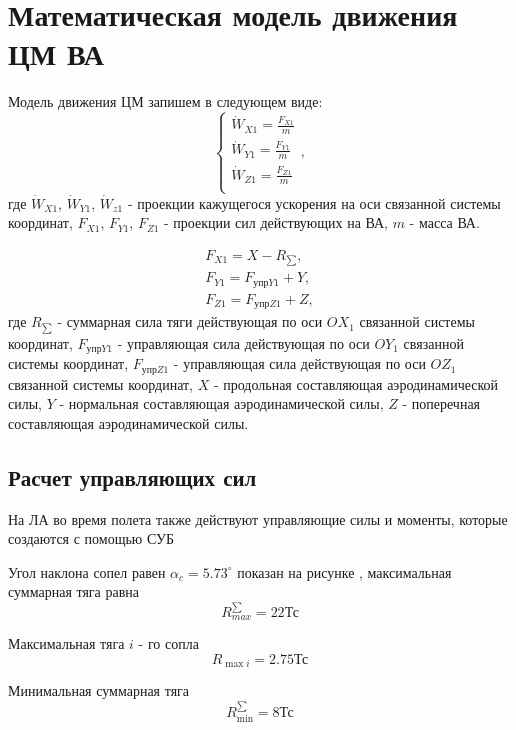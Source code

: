 \section{Математическая модель движения ЦМ ВА}
Модель движения ЦМ запишем в следующем виде:
\begin{equation}
	\left\{ \begin{matrix}
			\dot{W}_{X1} = \frac{F_{X1}}{m} \\
			\dot{W}_{Y1} = \frac{F_{Y1}}{m} \\
			\dot{W}_{Z1} = \frac{F_{Z1}}{m} \\
		\end{matrix} \right. ,
\end{equation}
где $\dot{W}_{X1}$, $\dot{W}_{Y1}$, $\dot{W}_{z1}$ - проекции кажущегося ускорения на оси связанной системы координат, $F_{X1}$, $F_{Y1}$, $F_{Z1}$ - проекции сил действующих на ВА, $m$ - масса ВА.

\begin{equation}
	\begin{gathered}
		F_{X1} = X - R_{\sum}, \\ 
		F_{Y1} = F_{\text{упр}Y1} + Y, \\
		F_{Z1} = F_{\text{упр}Z1} + Z,
	\end{gathered}
\end{equation}
где $R_{\sum}$ - суммарная сила тяги действующая по оси $OX_1$ связанной системы координат, $F_{\text{упр}Y1}$ - управляющая сила действующая по оси $OY_1$ связанной системы координат, $F_{\text{упр}Z1}$ - управляющая сила действующая по оси $OZ_1$ связанной системы координат, $X$ - продольная составляющая аэродинамической силы, $Y$ - нормальная составляющая аэродинамической силы, $Z$ - поперечная составляющая аэродинамической силы.
\clearpage

\subsection{Расчет управляющих сил}

На ЛА во время полета также действуют управляющие силы и моменты, которые создаются с помощью СУБ

Угол наклона сопел равен $\alpha_c = 5.73^{\circ}$ показан на рисунке , максимальная суммарная тяга равна $$R_{max}^{\sum} = 22 \text{Тс}$$

Максимальная тяга $i$ - го сопла $$R_{\max i} = 2.75 \text{Тс}$$

Минимальная суммарная тяга $$R^{\sum}_{\min} = 8 \text{Тс}$$

